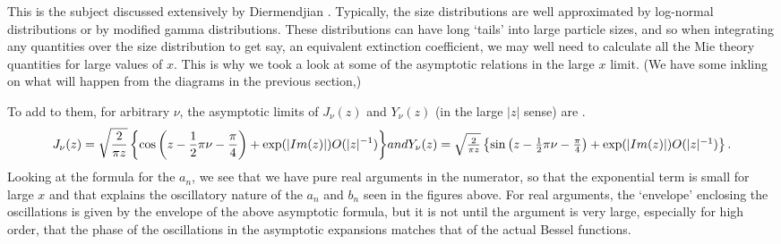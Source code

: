 This is the subject discussed extensively by Diermendjian \cite{Deirmendjian:Mybib}. Typically, the size distributions are well approximated by log-normal distributions or by modified gamma distributions. These distributions can have long `tails' into large particle sizes, and so when integrating any quantities over the size distribution to get say, an equivalent extinction coefficient, we may well need to calculate all the Mie theory quantities for large values of $x$. This is why we took a look at some of the asymptotic relations in the large $x$ limit. (We have some inkling on what will happen from the diagrams in 
the previous section,)

To add to them, for arbitrary $\nu$, the asymptotic limits of $J_\nu(z)$ and 
$Y_\nu (z)$ (in the large $\vert z \vert $ sense) are \cite{AbramowitzStegun:Mybib}.
\begin{equation}
J_\nu(z)=\sqrt{ \frac{2}{\pi z}}
   \left \lbrace
       \cos \left (z-\frac{1}{2} \pi \nu -\frac{\pi}{4} \right )
       +\exp( \vert Im(z) \vert)  O ( \vert z \vert^{-1} )
    \right \rbrace
$$   and $$
Y_\nu(z)=\sqrt{ \frac{2}{\pi z}}
   \left \lbrace
       \sin \left (z-\frac{1}{2} \pi \nu -\frac{\pi}{4} \right )
       +\exp( \vert Im(z) \vert) O ( \vert  z\vert^{-1} )
    \right \rbrace.
\end{equation}
Looking at the formula for the $a_n$, we see that we have pure real arguments
in the numerator, so that the exponential term is small for large $x$ and that
 explains the oscillatory nature of the $a_n$ and $b_n$ seen in the figures 
above. For real arguments, the `envelope' enclosing the oscillations is given
by the envelope of the above asymptotic formula, but it is not until the
argument is very large, especially for
 high order, that the phase of the oscillations in the asymptotic expansions
matches that of the actual Bessel functions.

